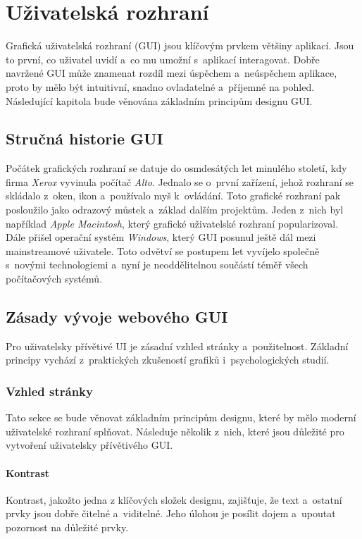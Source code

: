 \chapter{Uživatelská rozhraní}
Grafická uživatelská rozhraní (GUI) jsou klíčovým prvkem většiny aplikací. Jsou to první, co uživatel uvidí a~co mu umožní s~aplikací interagovat. Dobře navržené GUI může znamenat rozdíl mezi úspěchem a~neúspěchem aplikace, proto by mělo být intuitivní, snadno ovladatelné a~příjemné na pohled. Následující kapitola bude věnována základním principům designu GUI.

\section{Stručná historie GUI}
Počátek grafických rozhraní se datuje do osmdesátých let minulého století, kdy firma \textit{Xerox} vyvinula počítač \textit{Alto}. Jednalo se o~první zařízení, jehož rozhraní se skládalo z~oken, ikon a~používalo myš k~ovládání. Toto grafické rozhraní pak posloužilo jako odrazový můstek a~základ dalším projektům. Jeden z~nich byl například \textit{Apple Macintosh}, který grafické uživatelské rozhraní popularizoval. Dále přišel operační systém \textit{Windows}, který GUI posunul ještě dál mezi mainstreamové uživatele. Toto odvětví se postupem let vyvíjelo společně s~novými technologiemi a~nyní je neoddělitelnou součástí téměř všech počítačových systémů.

\section{Zásady vývoje webového GUI}
Pro uživatelsky přívětivé UI je zásadní vzhled stránky a~použitelnost. Základní principy vychází z~praktických zkušeností grafiků i~psychologických studií.

\subsection{Vzhled stránky}
Tato sekce se bude věnovat základním principům designu, které by mělo moderní uživatelské rozhraní splňovat. Následuje několik z~nich, které jsou důležité pro vytvoření uživatelsky přívětivého GUI. \cite{principles_of_design}

\subsubsection*{Kontrast}
Kontrast, jakožto jedna z klíčových složek designu, zajišťuje, že text a~ostatní prvky jsou dobře čitelné a~viditelné. Jeho úlohou je posílit dojem a~upoutat pozornost na důležité prvky.

